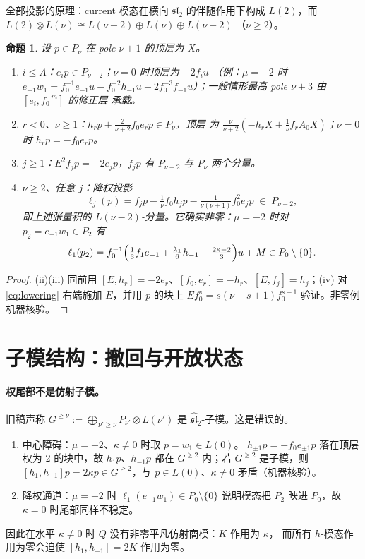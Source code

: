 \documentclass[11pt]{article}
\newcommand{\g}{\widehat{\mathfrak{sl}}_2}
\newcommand{\slc}{\mathfrak{sl}_2}
\newtheorem{proposition}[theorem]{命题}
\begin{document}
全部投影的原理：current 模态在横向 $\slc$ 的伴随作用下构成 $L(2)$，而
$L(2)\otimes L(\nu)\cong L(\nu+2)\oplus L(\nu)\oplus L(\nu-2)$
（$\nu\ge2$）。

\begin{proposition}\label{prop:proj}
设 $p\in P_\nu$ 在 pole $\nu+1$ 的顶层为 $X$。
\begin{enumerate}
\item[(i)] $i\le A$：$e_ip\in P_{\nu+2}$；$\nu=0$ 时顶层为 $-2f_iu$
（例：$\mu=-2$ 时 $e_{-1}w_1=f_0^{-1}e_{-1}u-f_0^{-2}h_{-1}u
-2f_0^{-3}f_{-1}u$）；一般情形最高 pole $\nu+3$ 由 $[e_i,f_0^{-m}]$ 的修正层
承载。
\item[(ii)] $r<0$、$\nu\ge1$：$h_rp+\tfrac{2}{\nu+2}f_0e_rp\in P_\nu$，顶层
为 $\tfrac{\nu}{\nu+2}(-h_rX+\tfrac1\nu f_rA_0X)$；$\nu=0$ 时
$h_rp=-f_0e_rp$。
\item[(iii)] $j\ge1$：$E^2f_jp=-2e_jp$，$f_jp$ 有 $P_{\nu+2}$ 与 $P_\nu$
两个分量。
\item[(iv)] $\nu\ge2$、任意 $j$：降权投影
\begin{equation}\label{eq:lowering}
 \ell_j(p)=f_jp-\tfrac1\nu f_0h_jp
 -\tfrac{1}{\nu(\nu+1)}f_0^2e_jp\;\in\;P_{\nu-2},
\end{equation}
即上述张量积的 $L(\nu-2)$-分量。它确实非零：$\mu=-2$ 时对
$p_2=e_{-1}w_1\in P_2$ 有
\[
 \ell_1(p_2)=f_0^{-1}\Bigl(\tfrac13f_1e_{-1}+\tfrac{\lambda_1}{6}h_{-1}
 +\tfrac{2\kappa-2}{3}\Bigr)u+M\in P_0\setminus\{0\}.
\]
\end{enumerate}
\end{proposition}

\begin{proof}
(ii)(iii) 同前用 $[E,h_r]=-2e_r$、$[f_0,e_r]=-h_r$、$[E,f_j]=h_j$；(iv) 对
\eqref{eq:lowering} 右端施加 $E$，并用 $p$ 的块上
$Ef_0^s=s(\nu-s+1)f_0^{s-1}$ 验证。非零例机器核验。
\end{proof}

\section{子模结构：撤回与开放状态}

\paragraph{权尾部不是仿射子模。}
旧稿声称 $G^{\ge\nu}:=\bigoplus_{\nu'\ge\nu}P_{\nu'}\otimes L(\nu')$ 是
$\g$-子模。这是错误的。
\begin{enumerate}
\item[(i)] 中心障碍：$\mu=-2$、$\kappa\ne0$ 时取 $p=w_1\in L(0)$。
$h_{\pm1}p=-f_0e_{\pm1}p$ 落在顶层权为 $2$ 的块中，故 $h_1p$、$h_{-1}p$
都在 $G^{\ge2}$ 内；若 $G^{\ge2}$ 是子模，则
$[h_1,h_{-1}]p=2\kappa p\in G^{\ge2}$，与 $p\in L(0)$、$\kappa\ne0$
矛盾（机器核验）。
\item[(ii)] 降权通道：$\mu=-2$ 时 $\ell_1(e_{-1}w_1)\in P_0\setminus\{0\}$
说明模态把 $P_2$ 映进 $P_0$，故 $\kappa=0$ 时尾部同样不稳定。
\end{enumerate}
因此在水平 $\kappa\ne0$ 时 $Q$ 没有非零平凡仿射商模：$K$ 作用为 $\kappa$，
而所有 $h$-模态作用为零会迫使 $[h_1,h_{-1}]=2K$ 作用为零。
\end{document}
